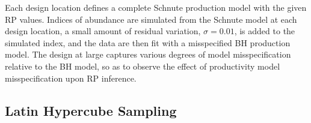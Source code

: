 \documentclass[12pt]{article}
\begin{document}
%
Each design location defines a complete Schnute production model with the given 
RP values. Indices of abundance are simulated from the Schnute model at each design
location, a small amount of residual variation, $\sigma=0.01$, is added to the 
simulated index, and the data are then fit with a misspecified BH production model. 
The design at large captures various degrees of model misspecification relative 
to the BH model, so as to observe the effect of productivity model misspecification 
upon RP inference.


%

%
%
%
%


%
\subsection{Latin Hypercube Sampling \label{lhs}}
\end{document}
